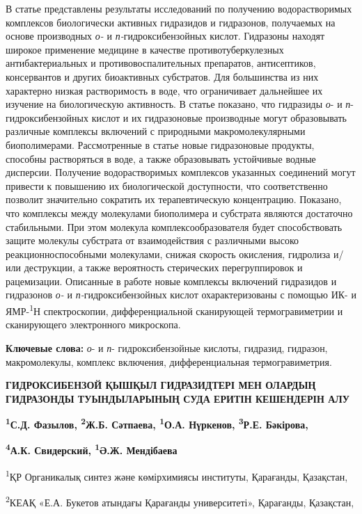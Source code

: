 В статье представлены результаты исследований по получению
водорастворимых комплексов биологически активных гидразидов и
гидразонов, получаемых на основе производных \emph{о-} и
\emph{п-}гидроксибензойных кислот. Гидразоны находят широкое применение
медицине в качестве противотуберкулезных антибактериальных и
противовоспалительных препаратов, антисептиков, консервантов и других
биоактивных субстратов. Для большинства из них характерно низкая
растворимость в воде, что ограничивает дальнейшее их изучение на
биологическую активность. В статье показано, что гидразиды \emph{о}- и
\emph{п}- гидроксибензойных кислот и их гидразоновые производные могут
образовывать различные комплексы включений с природными
макромолекулярными биополимерами. Рассмотренные в статье новые
гидразоновые продукты, способны растворяться в воде, а также
образовывать устойчивые водные дисперсии. Получение водорастворимых
комплексов указанных соединений могут привести к повышению их
биологической доступности, что соответственно позволит значительно
сократить их терапевтическую концентрацию. Показано, что комплексы между
молекулами биополимера и субстрата являются достаточно стабильными. При
этом молекула комплексообразователя будет способствовать защите молекулы
субстрата от взаимодействия с различными высоко реакционноспособными
молекулами, снижая скорость окисления, гидролиза и/или деструкции, а
также вероятность стерических перегруппировок и рацемизации. Описанные в
работе новые комплексы включений гидразидов и гидразонов \emph{о-} и
\emph{п-}гидроксибензойных кислот охарактеризованы с помощью ИК- и
ЯМР-\textsuperscript{1}Н спектроскопии, дифференциальной сканирующей
термогравиметрии и сканирующего электронного микроскопа.

{\bfseries Ключевые слова:} \emph{о}- и \emph{п}- гидроксибензойные
кислоты, гидразид, гидразон, макромолекулы, комплекс включения,
дифференциальная термогравиметрия.

{\bfseries ГИДРОКСИБЕНЗОЙ ҚЫШҚЫЛ ГИДРАЗИДТЕРІ МЕН ОЛАРДЫҢ ГИДРАЗОНДЫ
ТУЫНДЫЛАРЫНЫҢ СУДА ЕРИТІН КЕШЕНДЕРІН АЛУ}

{\bfseries \textsuperscript{1}С.Д. Фазылов, \textsuperscript{2}Ж.Б.
Сәтпаева, \textsuperscript{1}О.А. Нүркенов, \textsuperscript{3}Р.Е.
Бәкірова,}

{\bfseries \textsuperscript{4}А.К. Свидерский, \textsuperscript{1}Ә.Ж.
Мендібаева}

\textsuperscript{1}ҚР Органикалық синтез және көмірхимиясы институты,
Қарағанды, Қазақстан,

\textsuperscript{2}КЕАҚ «Е.А. Букетов атындағы Қарағанды университеті»,
Қарағанды, Қазақстан,

